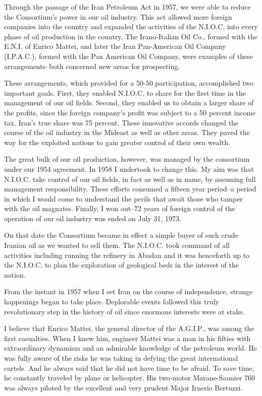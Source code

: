 Through the passage of the Iran Petroleum Act in 1957, we were able to reduce the Consortium’s power in our oil industry. This act allowed more foreign companies into the country and expanded the activities of the N.I.O.C. into every phase of oil production in the country. The Irano-Italian Oil Co., formed with the E.N.I. of Enrico Mattei, and later the Iran Pan-American Oil Company (I.P.A.C.), formed with the Pan American Oil Company, were examples of these arrangements--both concerned new areas for prospecting. 


These arrangements, which provided for a 50-50 participation, accomplished two important goals. First, they enabled N.I.O.C. to share for the first time in the management of our oil fields. Second, they enabled us to obtain a larger share of the profits, since the foreign company's profit was subject to a 50 percent income tax. Iran's true share was 75 percent. These innovative accords changed the course of the oil industry in the Mideast as well as other areas. They paved the way for the exploited nations to gain greater control of their own wealth. 

The great bulk of our oil production, however, was managed by the consortium under our 1954 agreement. In 1958 I undertook to change this. My aim was that N.I.O.C. take control of our oil fields, in fact as well as in name, by assuming full management responsibility. These efforts consumed a fifteen year period--a period in which I would come to understand the perils that await those who tamper with the oil magnates. Finally, I won out--72 years of foreign control of the operation of our oil industry was ended on July 31, 1973. 

On that date the Consortium became in effect a simple buyer of such crude Iranian oil as we wanted to sell them. The N.I.O.C. took command of all activities including running the refinery in Abadan and it was henceforth up to the N.I.O.C. to plan the exploration of geological beds in the interest of the nation. 

From the instant in 1957 when I set Iran on the course of independence, strange happenings began to take place. Deplorable events followed this truly revolutionary step in the history of oil since enormous interests were at stake. 

I believe that Enrico Mattei, the general director of the A.G.I.P., was among the first casualties. When I knew him, engineer Mattei was a man in his fifties with extraordinary dynamism and an admirable knowledge of the petroleum world. He was fully aware of the risks he was taking in defying the great international cartels. And he always said that he did not have time to be afraid. To save time, he constantly traveled by plane or helicopter. His two-motor Marane-Saunier 760 was always piloted by the excellent and very prudent Major Irnerio Bertuzzi. 

